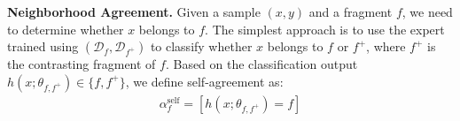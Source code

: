 \documentclass{article}
\theoremstyle{plain}
\theoremstyle{definition}
\theoremstyle{remark}
\begin{document}
\textbf{Neighborhood Agreement.}
% 
Given a sample $(x, y)$ and a fragment $f$, we need to determine whether $x$ belongs to $f$.
The simplest approach is to use the expert trained using $(\mathcal{D}_f, \mathcal{D}_{f^+})$ to classify whether $x$ belongs to $f$ or $f^+$, where $f^+$ is the contrasting fragment of $f$.
Based on the classification output $h(x; \theta_{f, f^+}) \in \{f, f^+\}$, we define self-agreement as:
\begin{align}
   \alpha^\text{self}_f = 
       [h(x; \theta_{f, f^+}) = f] %
\label{eq:self_agreement}
\end{align}
\end{document}

